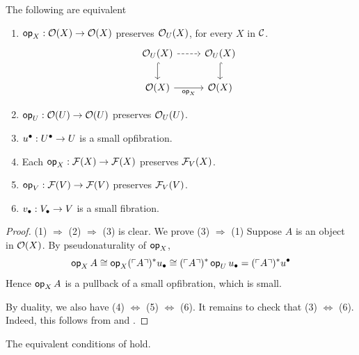 \begin{proposition}\label{prop:vertical-opposite-small}
  The following are equivalent
  \begin{enumerate}
    \item $\vOp[X] : \opfibcart(X) \to \opfibcart(X)$ preserves $\opfibcart_\U(X)$,
    for every $X$ in $\CC$.
    \[ \begin{tikzcd}
      {\opfibcart_\U(X)} & {\opfibcart_\U(X)} \\
      {\opfibcart(X)} & {\opfibcart(X)}
      \arrow[dashed, from=1-1, to=1-2]
      \arrow[hook, from=1-1, to=2-1]
      \arrow[hook, from=1-2, to=2-2]
      \arrow["{\vOp[X]{}}"', from=2-1, to=2-2]
    \end{tikzcd} \]
    \item $\vOp[\U] : \opfibcart(\U) \to \opfibcart(\U)$ preserves $\opfibcart_\U(\U)$.
    \item $\uupp : \Uupp \to \U$ is a small opfibration.
    \item Each $\vOp[X] : \fibcart(X) \to \fibcart(X)$ preserves $\fibcart_\V(X)$.
    \item $\vOp[\V] : \fibcart(\V) \to \fibcart(\V)$ preserves $\fibcart_\V(\V)$.
    \item $\vupp : \Vupp \to \V$ is a small fibration.
  \end{enumerate}
\end{proposition}
\begin{proof}
  (1) $\Rightarrow$ (2) $\Rightarrow$ (3) is clear.
  We prove (3) $\Rightarrow$ (1)
  Suppose $A$ is an object in $\opfibcart(X)$.
  By pseudonaturality of $\vOp[X]{}$,
  \[ \vOp[X]{A} \iso \vOp[X]{(\ulcorner A \urcorner)^* \ulow}
    \iso (\ulcorner A \urcorner)^* \vOp[\U]{\ulow}
    = (\ulcorner A \urcorner)^* \uupp \]
  Hence $\vOp[X]{A}$ is a pullback of a small opfibration,
  which is small.

  By duality, we also have (4) $\Leftrightarrow$ (5) $\Leftrightarrow$ (6).
  It remains to check that (3) $\Leftrightarrow$ (6).
  Indeed, this follows from 
   and .
\end{proof}

\begin{axiom}\label{ax:vertical-opposite-small}
  The equivalent conditions of
   hold.
\end{axiom}

